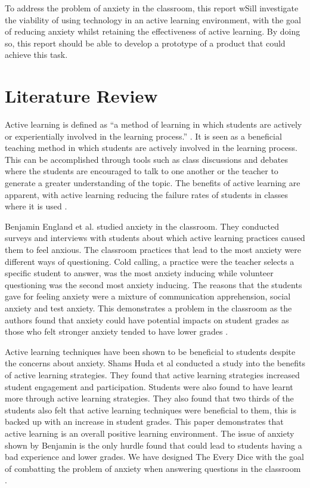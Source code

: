 \documentclass{sigchi}
\begin{document}
To address the problem of anxiety in the classroom, this report wSill investigate the viability of using technology in an active learning environment, with the goal of reducing anxiety whilst retaining the effectiveness of active learning. By doing so, this report should be able to develop a prototype of a product that could achieve this task. 

\section{Literature Review}

Active learning is defined as “a method of learning in which students are actively or experientially involved in the learning process.” \cite{bonwell_eison_1991}. It is seen as a beneficial teaching method in which students are actively involved in the learning process. This can be accomplished through tools such as class discussions and debates where the students are encouraged to talk to one another or the teacher to generate a greater understanding of the topic. The benefits of active learning are apparent, with active learning reducing the failure rates of students in classes where it is used \cite{freeman_eddy_mcdonough_smith_okoroafor_jordt_wenderoth_2014}.  

Benjamin England et al. studied anxiety in the classroom. They conducted surveys and interviews with students about which active learning practices caused them to feel anxious. The classroom practices that lead to the most anxiety were different ways of questioning. Cold calling, a practice were the teacher selects a specific student to answer, was the most anxiety inducing while volunteer questioning was the second most anxiety inducing. The reasons that the students gave for feeling anxiety were a mixture of communication apprehension, social anxiety and test anxiety. This demonstrates a problem in the classroom as the authors found that anxiety could have potential impacts on student grades as those who felt stronger anxiety tended to have lower grades \cite{england_brigati_schussler_2017}.

Active learning techniques have been shown to be beneficial to students despite the concerns about anxiety. Shams Huda et al conducted a study into the benefits of active learning strategies. They found that active learning strategies increased student engagement and participation. Students were also found to have learnt more through active learning strategies. They also found that two thirds of the students also felt that active learning techniques were beneficial to them, this is backed up with an increase in student grades. This paper demonstrates that active learning is an overall positive learning environment. The issue of anxiety shown by Benjamin is the only hurdle found that could lead to students having a bad experience and lower grades. We have designed The Every Dice with the goal of combatting the problem of anxiety when answering questions in the classroom \cite{ul_huda_ali_nanji_cassum_2016}.
\end{document}
